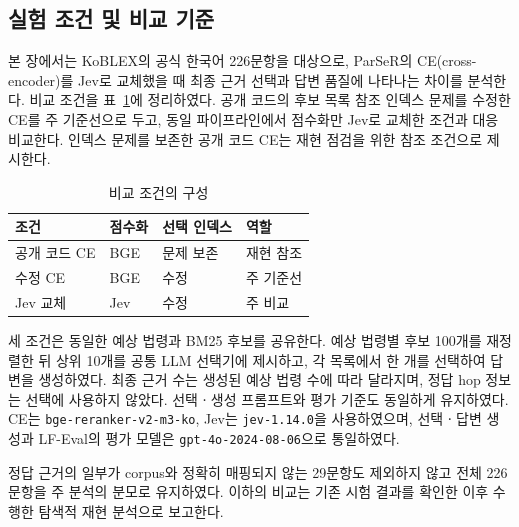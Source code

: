 
\subsection{실험 조건 및 비교 기준}
\label{sec:ch4_conditions}

본 장에서는 KoBLEX의 공식 한국어 226문항을 대상으로, ParSeR의
CE(cross-encoder)를 Jev로 교체했을 때 최종 근거 선택과 답변 품질에
나타나는 차이를 분석한다. 비교 조건을 표~\ref{tab:ch4_conditions}에 정리하였다.
공개 코드의 후보 목록 참조 인덱스 문제를 수정한 CE를 주 기준선으로
두고, 동일 파이프라인에서 점수화만 Jev로 교체한 조건과 대응 비교한다.
인덱스 문제를 보존한 공개 코드 CE는 재현 점검을 위한 참조 조건으로 제시한다.

\begin{table}[htbp]
    \centering
    \caption{비교 조건의 구성}
    \label{tab:ch4_conditions}
    \small
    \setlength{\tabcolsep}{4pt}
    \begin{tabular}{@{}llll@{}}
        \hline
        조건 & 점수화 & 선택 인덱스 & 역할 \\
        \hline
        공개 코드 CE & BGE & 문제 보존 & 재현 참조 \\
        수정 CE      & BGE & 수정      & 주 기준선 \\
        Jev 교체     & Jev & 수정      & 주 비교 \\
        \hline
    \end{tabular}
\end{table}

세 조건은 동일한 예상 법령과 BM25 후보를 공유한다. 예상 법령별 후보
100개를 재정렬한 뒤 상위 10개를 공통 LLM 선택기에 제시하고,
각 목록에서 한 개를 선택하여 답변을 생성하였다. 최종 근거 수는 생성된
예상 법령 수에 따라 달라지며, 정답 hop 정보는 선택에 사용하지 않았다.
선택ㆍ생성 프롬프트와 평가 기준도 동일하게 유지하였다.
CE는 \texttt{bge-reranker-v2-m3-ko}, Jev는 \texttt{jev-1.14.0}을
사용하였으며, 선택ㆍ답변 생성과 LF-Eval의 평가 모델은
\texttt{gpt-4o-2024-08-06}으로 통일하였다.

정답 근거의 일부가 corpus와 정확히 매핑되지 않는 29문항도 제외하지
않고 전체 226문항을 주 분석의 분모로 유지하였다. 이하의 비교는 기존
시험 결과를 확인한 이후 수행한 탐색적 재현 분석으로 보고한다.
